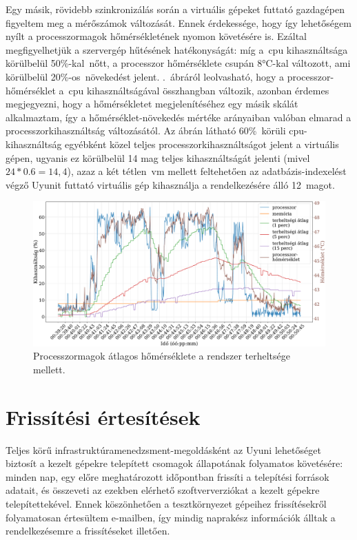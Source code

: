 Egy másik, rövidebb szinkronizálás során a virtuális gépeket futtató gazdagépen figyeltem meg a mérőszámok változását. Ennek érdekessége, hogy így lehetőségem nyílt a processzormagok hőmérsékletének nyomon követésére is. Ezáltal megfigyelhetjük a szervergép hűtésének hatékonyságát: míg a~\acrshort{cpu} kihasználtsága körülbelül 50\%-kal~nőtt, a processzor hőmérséklete csupán 8°C-kal változott, ami körülbelül 20\%-os~növekedést jelent. .~ábráról leolvasható, hogy a processzor-hőmérséklet a~\acrshort{cpu} kihasználtságával összhangban változik, azonban érdemes megjegyezni, hogy a hőmérsékletet megjelenítéséhez egy másik skálát alkalmaztam, így a hőmérséklet-növekedés mértéke arányaiban valóban elmarad a processzorkihasználtság változásától. Az ábrán látható 60\%~körüli \acrshort{cpu}-kihasználtság egyébként közel teljes processzorkihasználtságot jelent a virtuális gépen, ugyanis ez körülbelül 14 mag teljes kihasználtságát jelenti (mivel $ 24 * 0.6  = 14,4 $), azaz a két tétlen~\acrshort{vm} mellett feltehetően az adatbázis-indexelést végző Uyunit futtató virtuális gép kihasználja a rendelkezésére álló 12~magot.

\begin{figure}[ht]
	\centering
	\includegraphics[width=15cm]{figures/reposync-vhost-cputemp.pdf}
	\caption{Processzormagok átlagos hőmérséklete a rendszer terheltsége mellett.}
	\label{fig:reposync-vhost-cputemp}
\end{figure}

\section{Frissítési értesítések}
Teljes körű infrastruktúramenedzsment-megoldásként az Uyuni lehetőséget biztosít a kezelt gépekre telepített csomagok állapotának folyamatos követésére: minden nap, egy előre meghatározott időpontban frissíti a telepítési források adatait, és összeveti az ezekben elérhető szoftververziókat a kezelt gépekre telepítettekével. Ennek köszönhetően a tesztkörnyezet gépeihez  frissítésekről folyamatosan értesültem e-mailben, így mindig naprakész információk álltak a rendelkezésemre a frissítéseket illetően.

